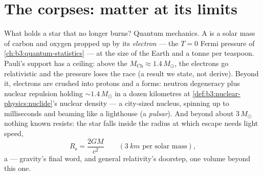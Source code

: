 \section{The corpses: matter at its limits}

\begin{proposition}\label{prop:b3:astrophysics:compact}
What holds a star that no longer burns? Quantum mechanics. A
\emph{} is a solar mass of carbon and oxygen propped
up by its \emph{electron } --- the $T = 0$
Fermi pressure of \cref{ch:b3:quantum-statistics} --- at the size
of the Earth and a tonne per teaspoon. Pauli's support has a
ceiling: above the \emph{} $M_{\text{Ch}}
\approx 1.4\,M_\odot$, the electrons go relativistic and the
pressure loses the race (a result we state, not derive). Beyond
it, electrons are crushed into protons and a \emph{}
forms: neutron degeneracy plus nuclear repulsion holding
$\sim1.4\,M_\odot$ in a dozen kilometres at
\cref{def:b3:nuclear-physics:nuclide}'s nuclear density --- a
city-sized nucleus, spinning up to milliseconds and beaming like
a lighthouse (a \emph{pulsar}). And beyond about $3\,M_\odot$
nothing known resists: the star falls inside the radius at which
escape needs light speed,
\[
R_{\text{s}} = \frac{2GM}{c^2}
\qquad (\qty{3}{km}\text{ per solar mass}) ,
\]
a \emph{} --- gravity's final word, and general
relativity's doorstep, one volume beyond this one.
\end{proposition}
\admitted

